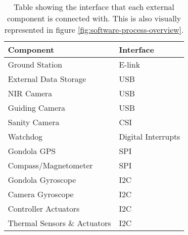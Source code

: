 \begin{table}[H]
	\centering
	\begin{tabular}{l|l}
		\textbf{Component}
		& \textbf{Interface} \\ \hline
		Ground Station
		& E-link             \\
		External Data Storage
		& USB            \\
		NIR Camera
		& USB                \\
		Guiding Camera
		& USB                \\		
		Sanity Camera
		& CSI                \\
		Watchdog
		& Digital Interrupts \\
		Gondola GPS
		& SPI                \\
		Compass/Magnetometer
		& SPI                \\
		Gondola Gyroscope
		& I2C                \\
		Camera Gyroscope   
		& I2C                \\
		Controller Actuators
		& I2C                \\
		Thermal Sensors \& Actuators
		& I2C
	\end{tabular}
	\caption{Table showing the interface that each external component is connected with. This is also visually represented in figure \ref{fig:software-process-overview}.}
	\label{tab:software-interfaces}
\end{table}

